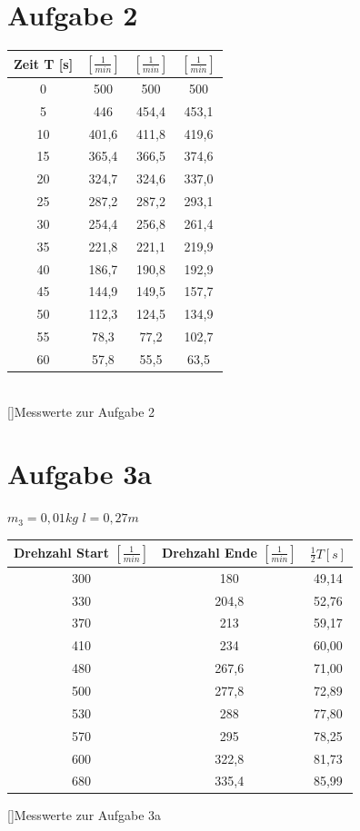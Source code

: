 \documentclass[12pt,a4paper,]{scrreprt}
\begin{document}
			\section{Aufgabe 2}
            \begin{center}
				\begin{tabular}{c|ccc}
                    Zeit T [s] &$[\frac{1}{min}]$& $[\frac{1}{min}]$& $[\frac{1}{min}]$\\ \hline \hline
                    0	&500	&500	&500\\
                    5	&446	&454,4	&453,1\\
                    10	&401,6	&411,8	&419,6\\
                    15	&365,4	&366,5	&374,6\\
                    20	&324,7	&324,6	&337,0\\
                    25	&287,2	&287,2	&293,1\\
                    30	&254,4	&256,8	&261,4\\
                    35	&221,8	&221,1	&219,9\\
                    40	&186,7	&190,8	&192,9\\
                    45	&144,9	&149,5	&157,7\\
                    50	&112,3	&124,5	&134,9\\
                    55	&78,3	&77,2	&102,7\\
                    60	&57,8	&55,5	&63,5\\
                \end{tabular}\\
        []{Messwerte zur Aufgabe 2}
                \end{center}
            \section{Aufgabe 3a}
            $m_3 = 0,01 kg$ $l= 0,27 m $
            \begin{center}
				\begin{tabular}{cc|c}
			Drehzahl Start $[\frac{1}{min}]$&Drehzahl Ende $[\frac{1}{min}]$& $\frac{1}{2}T [s]$  \\ \hline \hline
              300	&180	&49,14 \\
              330	&204,8	&52,76 \\
              370	&213	&59,17 \\
              410	&234	&60,00 \\
              480	&267,6	&71,00 \\
              500	&277,8	&72,89 \\
              530	&288	&77,80 \\
              570	&295	&78,25 \\
              600	&322,8	&81,73 \\
              680	&335,4	&85,99
			\end{tabular}
          []{Messwerte zur Aufgabe 3a}
            \end{center}
\end{document}
